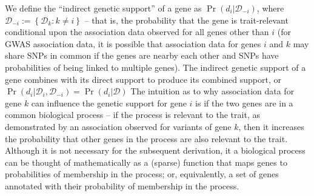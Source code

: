 We define the ``indirect genetic support'' of a gene as
$\Pr\left(d_i|\mathcal{D}_{-i}\right)$, where $\mathcal{D}_{-i} :=
\left\{\mathcal{D}_k : k \neq i\right\}$ -- that is, the probability that
the gene is trait-relevant conditional upon the association data
observed for all genes other than $i$ (for GWAS association data, it
is possible that association data for genes $i$ and $k$ may share
SNPs in common if the genes are nearby each other and SNPs have
probabilities of being linked to multiple genes). The indirect genetic
support of a gene combines with its direct support to produce its
combined support, or $\Pr\left(d_i|\mathcal{D}_{i},\mathcal{D}_{-i}\right)=\Pr\left(d_i|\mathcal{D}\right)$
The intuition as to
why association data for gene $k$ can influence the genetic support
for gene $i$ is if the two genes are in a common biological process
-- if the process is relevant to the trait, as demonstrated by an
association observed for variants of gene $k$, then it increases the
probability that other genes in the process are also relevant to the
trait. Although it is not necessary for the subsequent derivation, it
a biological process can be thought of mathematically as a (sparse)
function that maps genes to probabilities of membership in the
process; or, equivalently, a set of genes annotated with their
probability of membership in the process.

